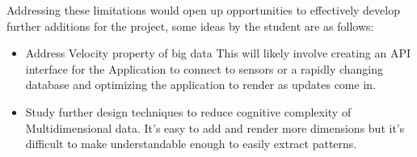 Addressing these limitations would open up opportunities to effectively develop further additions for the project, some ideas by the student are as follows:

\begin{itemize}
    \item Address Velocity property of big data \cite{7918044} This will likely involve creating an API interface for the Application to connect to sensors or a rapidly changing database and optimizing the application to render as updates come in.
    \item Study further design techniques to reduce cognitive complexity of Multidimensional data. It's easy to add and render more dimensions but it's difficult to make understandable enough to easily extract patterns.
\end{itemize}